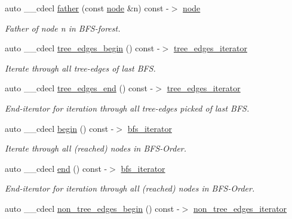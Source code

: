 \begin{DoxyCompactItemize}
auto \+\_\+\+\_\+cdecl \mbox{\hyperlink{classbfs_ab8a8b65048c4ffb6caa7651b793e4e56}{father}} (const \mbox{\hyperlink{classnode}{node}} \&n) const -\/$>$ \mbox{\hyperlink{classnode}{node}}
\begin{DoxyCompactList}\small\item\em Father of node {\itshape n} in B\+F\+S-\/forest. \end{DoxyCompactList}\item 
auto \+\_\+\+\_\+cdecl \mbox{\hyperlink{classbfs_aef8c6f063e1d1e52770f5adf12c7cb28}{tree\+\_\+edges\+\_\+begin}} () const -\/$>$ \mbox{\hyperlink{classbfs_aa0b58a03ca2fc32117948ab27a806bd1}{tree\+\_\+edges\+\_\+iterator}}
\begin{DoxyCompactList}\small\item\em Iterate through all tree-\/edges of last B\+FS. \end{DoxyCompactList}\item 
auto \+\_\+\+\_\+cdecl \mbox{\hyperlink{classbfs_a55e57b15957b08f3334568eeefb4223a}{tree\+\_\+edges\+\_\+end}} () const -\/$>$ \mbox{\hyperlink{classbfs_aa0b58a03ca2fc32117948ab27a806bd1}{tree\+\_\+edges\+\_\+iterator}}
\begin{DoxyCompactList}\small\item\em End-\/iterator for iteration through all tree-\/edges picked of last B\+FS. \end{DoxyCompactList}\item 
auto \+\_\+\+\_\+cdecl \mbox{\hyperlink{classbfs_a350eb3e4fcfea5c9c9cd18f54a722289}{begin}} () const -\/$>$ \mbox{\hyperlink{classbfs_acafce54954100cc7bc9f80eb318a7bee}{bfs\+\_\+iterator}}
\begin{DoxyCompactList}\small\item\em Iterate through all (reached) nodes in B\+F\+S-\/\+Order. \end{DoxyCompactList}\item 
auto \+\_\+\+\_\+cdecl \mbox{\hyperlink{classbfs_a355a37450bce8f14548983d5c6097aea}{end}} () const -\/$>$ \mbox{\hyperlink{classbfs_acafce54954100cc7bc9f80eb318a7bee}{bfs\+\_\+iterator}}
\begin{DoxyCompactList}\small\item\em End-\/iterator for iteration through all (reached) nodes in B\+F\+S-\/\+Order. \end{DoxyCompactList}\item 
auto \+\_\+\+\_\+cdecl \mbox{\hyperlink{classbfs_a15d846159cfe9524081ad318fb72661f}{non\+\_\+tree\+\_\+edges\+\_\+begin}} () const -\/$>$ \mbox{\hyperlink{classbfs_aecd86c7c1f1086d4b6b11c2a0eb12afe}{non\+\_\+tree\+\_\+edges\+\_\+iterator}}

\end{DoxyCompactItemize}

